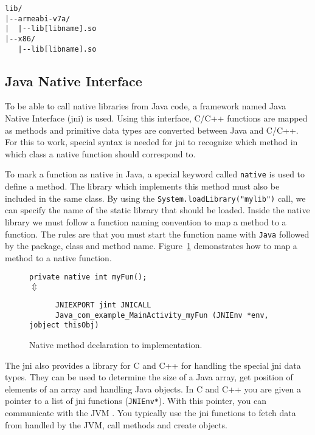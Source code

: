 \begin{verbatim}
lib/
|--armeabi-v7a/
|  |--lib[libname].so
|--x86/
   |--lib[libname].so
\end{verbatim}

\subsection{Java Native Interface}
To be able to call native libraries from Java code, a framework named Java Native Interface (\gls{jni}) is used. Using this interface, C/C++ functions are mapped as methods and primitive data types are converted between Java and C/C++. For this to work, special syntax is needed for \gls{jni} to recognize which method in which class a native function should correspond to.

To mark a function as native in Java, a special keyword called \texttt{native} is used to define a method. The library which implements this method must also be included in the same class. By using the \texttt{System.loadLibrary("mylib")} call, we can specify the name of the static library that should be loaded. Inside the native library we must follow a function naming convention to map a method to a function. The rules are that you must start the function name with \texttt{Java} followed by the package, class and method name. Figure~\ref{fig:native} demonstrates how to map a method to a native function.

\ifrelease
\begin{figure}[H]
\begin{center}
    \texttt{private native int myFun();}\\
    $\Updownarrow$
    \begin{verbatim}
      JNIEXPORT jint JNICALL
      Java_com_example_MainActivity_myFun (JNIEnv *env, jobject thisObj)
    \end{verbatim}
\end{center}
\caption{Native method declaration to implementation.}
\label{fig:native}
\end{figure}
\fi

The \gls{jni} also provides a library for C and C++ for handling the special \gls{jni} data types. They can be used to determine the size of a Java array, get position of elements of an array and handling Java objects. In C and C++ you are given a pointer to a list of \gls{jni} functions (\texttt{JNIEnv*}). With this pointer, you can communicate with the JVM \cite[p.~22]{liang1999java}. You typically use the \gls{jni} functions to fetch data from handled by the JVM, call methods and create objects.

